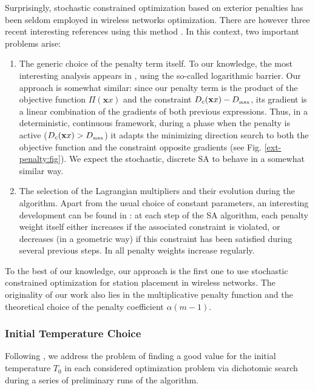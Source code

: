 \documentclass[draftcls,onecolumn]{IEEEtran}
\theoremstyle{plain}
\theoremstyle{definition}
\def\config{\mathbf{x}}
\def\constraintmax{D_{\mbox{{\tiny max}}}}
\begin{document}
Surprisingly, stochastic constrained optimization based on exterior penalties has been seldom employed in wireless networks optimization. There are however three recent interesting references using this method \cite{Yang11, Saifullah14, Azim12}. In this context, two important problems arise:
\begin{enumerate}
	\item The generic choice of the penalty term itself. To our knowledge, the most interesting analysis appears in \cite{Azim12}, using the so-called logarithmic barrier. Our approach is somewhat similar: since our penalty term is the product of the objective function $\Pi(\config{x})$ and the constraint $\constraint(\config{x}) - \constraintmax$, its gradient is a linear combination of the gradients of both previous expressions. Thus, in a deterministic, continuous framework, during a phase when the penalty is active ($\constraint(\config{x}) > \constraintmax$) it adapts the minimizing direction search to both the objective function and the constraint  opposite gradients (see Fig. \ref{ext-penalty:fig}). We expect the stochastic, discrete SA to behave in a somewhat similar way.
	\item The selection  of the Lagrangian multipliers and their evolution during the algorithm. Apart from the usual choice of constant parameters, an interesting development can be found in \cite{Yang11}: at each step of the SA algorithm, each penalty weight itself either increases if the associated constraint is violated, or decreases (in a geometric way) if this constraint has been satisfied during several previous steps. In \cite{Saifullah14} all penalty weights increase regularly.\end{enumerate}

To the best of our knowledge, our approach is the first one to use stochastic constrained optimization for station placement in wireless networks. The originality of our work also lies in the multiplicative penalty function and the theoretical choice of the penalty coefficient $\alpha(m-1)$. 





\subsubsection{Initial Temperature Choice} 
Following \cite{relplac}, we address the problem of finding a good value for the initial temperature $T_0$ in each considered optimization problem via dichotomic search during a series of preliminary runs of the algorithm.   
\end{document}
